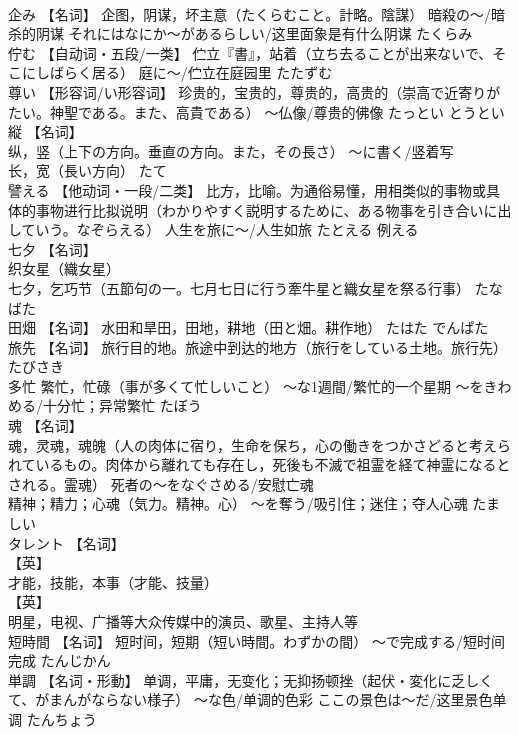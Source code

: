 \documentclass[8pt]{extreport}
\begin{document}
\begin{CJK}{UTF8}{min}
\\	企み	【名词】 企图，阴谋，坏主意（たくらむこと。計略。陰謀） 暗殺の～/暗杀的阴谋 それにはなにか～があるらしい/这里面象是有什么阴谋	たくらみ	
\\	佇む	【自动词・五段/一类】 伫立『書』，站着（立ち去ることが出来ないで、そこにしばらく居る） 庭に～/伫立在庭园里	たたずむ	
\\	尊い	【形容词/い形容词】 珍贵的，宝贵的，尊贵的，高贵的（崇高で近寄りがたい。神聖である。また、高貴である） ～仏像/尊贵的佛像	たっとい とうとい	
\\	縦	【名词】 
\\	纵，竖（上下の方向。垂直の方向。また，その長さ） ～に書く/竖着写 
\\	长，宽（長い方向）	たて	
\\	譬える	【他动词・一段/二类】 比方，比喻。为通俗易懂，用相类似的事物或具体的事物进行比拟说明（わかりやすく説明するために、ある物事を引き合いに出していう。なぞらえる） 人生を旅に～/人生如旅	たとえる	例える
\\	七夕	【名词】 
\\	织女星（織女星） 
\\	七夕，乞巧节（五節句の一。七月七日に行う牽牛星と織女星を祭る行事）	たなばた	
\\	田畑	【名词】 水田和旱田，田地，耕地（田と畑。耕作地）	たはた でんぱた	
\\	旅先	【名词】 旅行目的地。旅途中到达的地方（旅行をしている土地。旅行先）	たびさき	
\\	多忙	繁忙，忙碌（事が多くて忙しいこと） ～な1週間/繁忙的一个星期 ～をきわめる/十分忙；异常繁忙	たぼう	
\\	魂	【名词】 
\\	魂，灵魂，魂魄（人の肉体に宿り，生命を保ち，心の働きをつかさどると考えられているもの。肉体から離れても存在し，死後も不滅で祖霊を経て神霊になるとされる。霊魂） 死者の～をなぐさめる/安慰亡魂 
\\	精神；精力；心魂（気力。精神。心） ～を奪う/吸引住；迷住；夺人心魂	たましい	
\\	タレント	【名词】 
\\	【英】
\\	才能，技能，本事（才能、技量） 
\\	【英】
\\	明星，电视、广播等大众传媒中的演员、歌星、主持人等		
\\	短時間	【名词】 短时间，短期（短い時間。わずかの間） ～で完成する/短时间完成	たんじかん	
\\	単調	【名词・形動】 单调，平庸，无变化；无抑扬顿挫（起伏・変化に乏しくて、がまんがならない様子） ～な色/单调的色彩 ここの景色は～だ/这里景色单调	たんちょう	

\end{CJK}
\end{document}
